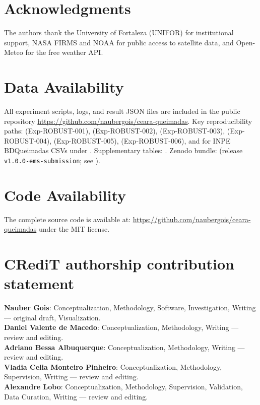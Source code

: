 \documentclass[preprint,12pt,times,numbers]{elsarticle}
\begin{document}
\section*{Acknowledgments}

The authors thank the University of Fortaleza (UNIFOR) for institutional support, NASA FIRMS and NOAA for public access to satellite data, and Open-Meteo for the free weather API.

\section*{Data Availability}

All experiment scripts, logs, and result JSON files are included in the public repository \url{https://github.com/naubergois/ceara-queimadas}. Key reproducibility paths:  (Exp-ROBUST-001),  (Exp-ROBUST-002),  (Exp-ROBUST-003),  (Exp-ROBUST-004),  (Exp-ROBUST-005),  (Exp-ROBUST-006), and  for INPE BDQueimadas CSVs under . Supplementary tables: . Zenodo bundle:  (release \texttt{v1.0.0-ems-submission}; see ).

\section*{Code Availability}

The complete source code is available at: \url{https://github.com/naubergois/ceara-queimadas} under the MIT license.

\section*{CRediT authorship contribution statement}
\label{sec:credit}

\textbf{Nauber Gois}: Conceptualization, Methodology, Software, Investigation, Writing --- original draft, Visualization.\\
\textbf{Daniel Valente de Macedo}: Conceptualization, Methodology, Writing --- review and editing.\\
\textbf{Adriano Bessa Albuquerque}: Conceptualization, Methodology, Writing --- review and editing.\\
\textbf{Vladia Celia Monteiro Pinheiro}: Conceptualization, Methodology, Supervision, Writing --- review and editing.\\
\textbf{Alexandre Lobo}: Conceptualization, Methodology, Supervision, Validation, Data Curation, Writing --- review and editing.
\end{document}
